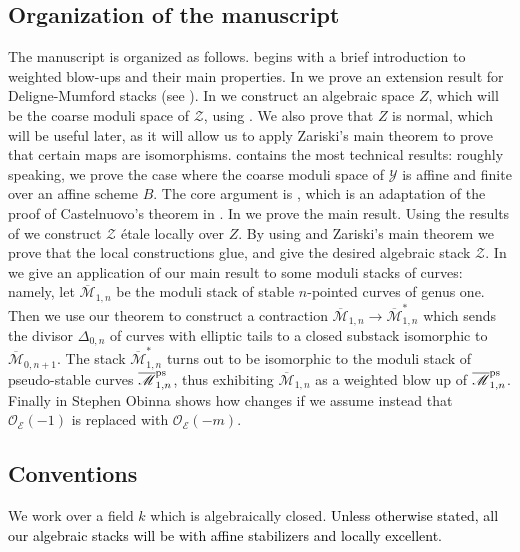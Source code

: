 \documentclass{amsart}
\newcommand{\cE}{\mathcal{E}}
\newcommand{\cO}{\mathcal{O}}
\newcommand{\cY}{\mathcal{Y}}
\newcommand{\cZ}{\mathcal{Z}}
\theoremstyle{definition}
\begin{document}
\subsection{Organization of the manuscript}
The manuscript is organized as follows.   begins with a brief introduction to weighted blow-ups and their main properties.
In  we prove an extension result for Deligne-Mumford stacks (see ).
In  we construct an algebraic space $Z$, which will be the coarse moduli space of $\cZ$, using \cite{artin1970algebraization}. We also prove that $Z$ is normal, which will be useful later, as it will allow us to apply Zariski's main theorem to prove that certain maps are isomorphisms. 
 contains the most technical results: roughly speaking, we prove the case where the coarse moduli space of $\cY$ is affine and finite over an affine scheme $B$. The core argument is , which is an adaptation of the proof of Castelnuovo's theorem in \cite{kol_resol}.
In  we prove the main result. Using the results of  we construct $\cZ$ \'etale locally over $Z$. By using  and Zariski's main theorem we prove that the local constructions glue, and give the desired algebraic stack $\cZ$. 
In  we give an application of our main result to some moduli stacks of curves: namely, let $\overline{\mathscr{M}}_{1,n}$ be the moduli stack of stable $n$-pointed curves of genus one. Then we use our theorem to construct a contraction $\overline{\mathscr{M}}_{1,n}\to \overline{\mathscr{M}}^*_{1,n}$ which sends the divisor $\Delta_{0,n}$ of curves with elliptic tails to a closed substack isomorphic to $\overline{\mathscr{M}}_{0,n+1}$. The stack $\overline{\mathscr{M}}_{1,n}^*$ turns out to be isomorphic to the moduli stack of pseudo-stable curves $\overline{\mathscr{M}}_{1,n}^{\rm{ps}}$, thus exhibiting $\overline{\mathscr{M}}_{1,n}$ as  a weighted blow up of $\overline{\mathscr{M}}_{1,n}^{\rm{ps}}$.
Finally in  Stephen Obinna shows how  changes if we assume instead that $\cO_\cE(-1)$ is replaced with $\cO_\cE(-m)$.
 
 \subsection*{Conventions} We work over a field $k$ which is algebraically closed. \textcolor{black}{Unless otherwise stated, all our algebraic stacks will be with affine stabilizers and locally excellent.}\\
 
\end{document}

